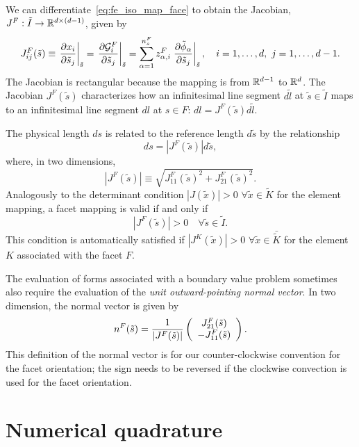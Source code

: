 We can differentiate~\eqref{eq:fe_iso_map_face} to obtain the Jacobian, $J^F: \tilde I \to \RR^{d \times (d-1)}$, given by
\begin{equation*}
  J^F_{ij}(\tilde s)
  \equiv
  \left. \pp{x_i}{\tilde s_j} \right|_{\tilde s}
  =
  \left. \pp{\calG^F_i}{\tilde s_j} \right|_{\tilde s}
  =
  \sum_{\alpha = 1}^{n_s^F} z^F_{\alpha,i} \left. \pp{\tilde \phi_\alpha}{\tilde s_j} \right|_{\tilde s},
  \quad i = 1,\dots,d, \ j = 1,\dots,d-1.
\end{equation*}
The Jacobian is rectangular because the mapping is from $\RR^{d-1}$ to $\RR^d$. The Jacobian $J^F(\tilde s)$ characterizes how an infinitesimal line segment $d\tilde l$ at $\tilde s \in \tilde I$ maps to an infinitesimal line segment $dl$ at $s \in F$: $dl = J^F(\tilde s) d\tilde l$.

The physical length $ds$ is related to the reference length $d\tilde s$ by the relationship
\begin{equation*}
  ds = |J^F(\tilde s)|d\tilde s,
\end{equation*}
where, in two dimensions, 
\begin{equation*}
  |J^F(\tilde s)| \equiv \sqrt{J^F_{11}(\tilde s)^2 + J^F_{21}(\tilde s)^2}.
\end{equation*}
Analogously to the determinant condition $|J(\tilde x)| > 0$ $\forall \tilde x \in \tilde K$ for the element mapping, a facet mapping is valid if and only if
\begin{equation*}
  |J^F(\tilde s)| > 0 \quad \forall \tilde s \in \tilde I.
\end{equation*}
This condition is automatically satisfied if $|J^K(\tilde x)| >0$ $\forall \tilde x \in \bar{\tilde K}$ for the element $K$ associated with the facet $F$.

The evaluation of forms associated with a boundary value problem sometimes also require the evaluation of the \emph{unit outward-pointing normal vector}. In two dimension, the normal vector is given by
\begin{equation*}
  n^F(\tilde s) = \frac{1}{|J^F(\tilde s)|} \bmat{c} J^F_{21}(\tilde s) \\ -J^F_{11}(\tilde s) \emat .
\end{equation*}
This definition of the normal vector is for our counter-clockwise convention for the facet orientation; the sign needs to be reversed if the clockwise convection is used for the facet orientation.

\section{Numerical quadrature}
\label{sec:fe_quad}
